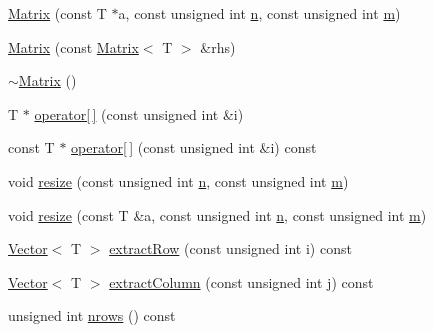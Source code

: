 \begin{DoxyCompactItemize}
\item 
\mbox{\hyperlink{classMatrix_a33a507863c86bbc82e650054f1cc13b6_a33a507863c86bbc82e650054f1cc13b6}{Matrix}} (const T $\ast$a, const unsigned int \mbox{\hyperlink{classMatrix_afe2ef09343ff36b98618d696e7b232e3_afe2ef09343ff36b98618d696e7b232e3}{n}}, const unsigned int \mbox{\hyperlink{classMatrix_a0a922a1712cf7e9afb32fd8fff6809df_a0a922a1712cf7e9afb32fd8fff6809df}{m}})
\item 
\mbox{\hyperlink{classMatrix_a6a46705243036bfeee78fe2c84c54340_a6a46705243036bfeee78fe2c84c54340}{Matrix}} (const \mbox{\hyperlink{classMatrix}{Matrix}}$<$ T $>$ \&rhs)
\item 
\mbox{\hyperlink{classMatrix_a91aa704de674203e96aece9e1955ccd3_a91aa704de674203e96aece9e1955ccd3}{$\sim$\+Matrix}} ()
\item 
T $\ast$ \mbox{\hyperlink{classMatrix_a771eff354da6c0008228dc19cde4142a_a771eff354da6c0008228dc19cde4142a}{operator\mbox{[}$\,$\mbox{]}}} (const unsigned int \&i)
\item 
const T $\ast$ \mbox{\hyperlink{classMatrix_af58cf6372d17f7abf5396d32f3ef5cd7_af58cf6372d17f7abf5396d32f3ef5cd7}{operator\mbox{[}$\,$\mbox{]}}} (const unsigned int \&i) const
\item 
void \mbox{\hyperlink{classMatrix_a8d10454cfe9427269b54a754262004b8_a8d10454cfe9427269b54a754262004b8}{resize}} (const unsigned int \mbox{\hyperlink{classMatrix_afe2ef09343ff36b98618d696e7b232e3_afe2ef09343ff36b98618d696e7b232e3}{n}}, const unsigned int \mbox{\hyperlink{classMatrix_a0a922a1712cf7e9afb32fd8fff6809df_a0a922a1712cf7e9afb32fd8fff6809df}{m}})
\item 
void \mbox{\hyperlink{classMatrix_ae866a1b312aa040b587b40c5f54b6a54_ae866a1b312aa040b587b40c5f54b6a54}{resize}} (const T \&a, const unsigned int \mbox{\hyperlink{classMatrix_afe2ef09343ff36b98618d696e7b232e3_afe2ef09343ff36b98618d696e7b232e3}{n}}, const unsigned int \mbox{\hyperlink{classMatrix_a0a922a1712cf7e9afb32fd8fff6809df_a0a922a1712cf7e9afb32fd8fff6809df}{m}})
\item 
\mbox{\hyperlink{classVector}{Vector}}$<$ T $>$ \mbox{\hyperlink{classMatrix_a7dded77c0f4c424c98858b5f94c13c16_a7dded77c0f4c424c98858b5f94c13c16}{extract\+Row}} (const unsigned int i) const
\item 
\mbox{\hyperlink{classVector}{Vector}}$<$ T $>$ \mbox{\hyperlink{classMatrix_a4361c4478b01f7df1173e5b64eccd127_a4361c4478b01f7df1173e5b64eccd127}{extract\+Column}} (const unsigned int j) const
\item 
unsigned int \mbox{\hyperlink{classMatrix_ad025820349fa69f73f2da395af627741_ad025820349fa69f73f2da395af627741}{nrows}} () const

\end{DoxyCompactItemize}
